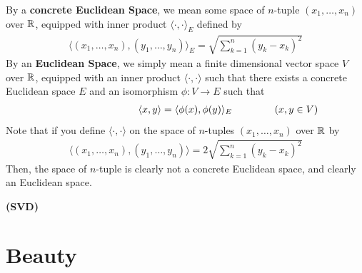 \documentclass{report}
\begin{document}
\begin{mdframed}
  By a \textbf{concrete Euclidean Space}, we mean some space of $n$-tuple  $(x_1,\dots ,x_n)$ over $\mathbb{R}$, equipped with inner product  $\langle \cdot,\cdot\rangle_E$ defined by 
\begin{align*}
  \langle  (x_1,\dots,x_n)  ,(y_1,\dots ,y_n)\rangle_E= \sqrt{\sum_{k=1}^n (y_k-x_k)^2} 
\end{align*}
By an \textbf{Euclidean Space}, we simply mean a finite dimensional vector space $V$ over $\mathbb{R}$,  equipped with an inner product $\langle \cdot,\cdot\rangle $ such that there exists a concrete Euclidean space $E$ and an isomorphism  $\phi:V\to E$ such that 
\begin{align*}
\hspace{3cm}\langle x,y\rangle= \langle \phi (x),\phi (y)\rangle_E \hspace{1.5cm}(x,y \in V)
\end{align*}
Note that if you define $\langle \cdot,\cdot\rangle $ on the space of $n$-tuples $(x_1,\dots ,x_n)$ over $\mathbb{R}$ by 
\begin{align*}
  \langle  (x_1,\dots,x_n)  ,(y_1,\dots ,y_n)\rangle=2 \sqrt{\sum_{k=1}^n (y_k-x_k)^2} 
\end{align*}
Then, the space of $n$-tuple is clearly not a concrete Euclidean space, and clearly an Euclidean space. 

\end{mdframed}
\textbf{(SVD)}

\chapter{Beauty}
\end{document}
